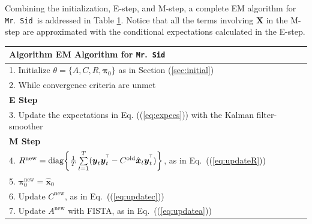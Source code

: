 \documentclass[fleqn,12pt]{article}
\let\oldref\ref
\renewcommand{\ref}[1]{(\oldref{#1})}
\newcommand{\T}{^{\ensuremath{\mathsf{T}}}}           %
\newcommand{\mrsid}{{\sc \texttt{Mr}.~\texttt{Sid}}}
\newcommand{\diag}{\operatornamewithlimits{diag}}
\providecommand{\mb}[1]{\boldsymbol{#1}}
\newcommand{\bx}{\mb{x}}
\newcommand{\by}{\mb{y}}
\newcommand{\bX}{\mb{X}}
\begin{document}
Combining the initialization, E-step, and M-step, a complete EM algorithm for \mrsid~is addressed in Table \oldref{tab:em}. Notice that all the terms involving $\bX$ in the M-step are approximated with the conditional expectations calculated in the E-step.\\
\begin{table}
\label{tab:em}
\begin{tabular}{l}
\hline
\textbf{Algorithm } EM Algorithm for \mrsid\\
\hline
1. Initialize $\theta =\{A,C,R,\mathbf{\pi}_0\}$ as in Section \oldref{sec:initial}\\

2. While convergence criteria are unmet \\
%
%
%
\textbf{E Step}\\
3. Update the expectations in Eq. \ref{eq:expecs} with the Kalman filter-smoother\\

\textbf{M Step}\\
%
%
%
4. $R^{\text{new}}=\diag\biggl\{\frac{1}{T}\sum\limits_{t=1}^{T}(\by_t\by_t^{\T}-C^{\text{old}} \hat{\bx}_t\by_t^{\T})\biggr\}$, as in Eq.~\ref{eq:updateR}\\
5. $\mathbf{\pi}_0^{\text{new}}=\hat{\bx}_0$\\
6. Update $C^{\text{new}}$, as in Eq.~\ref{eq:updatec}\\
7. Update $A^{\text{new}}$ with FISTA, as in Eq.~\ref{eq:updatea}\\
\hline
\end{tabular}
\end{table}
\end{document}
